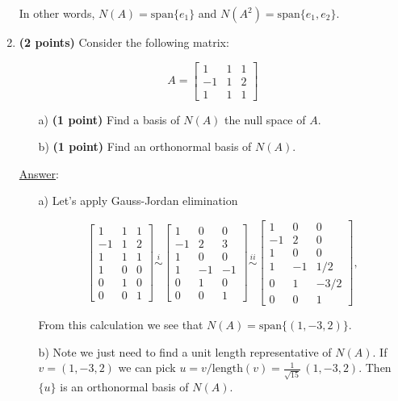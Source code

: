 \documentclass[]{book}
\theoremstyle{definition}
\newcommand{\length}{\textrm{length}}
\newcommand\ans{\underline{Answer}: }
\begin{document}
\begin{enumerate}
In other words, $N(A) = \textrm{span}\{e_1\}$ and $N(A^2) = \textrm{span}\{e_1, e_2\}$. 



\item {\bf (2 points)} Consider the following matrix:

\[
A = \begin{bmatrix}
1 & 1 & 1 \\
-1 & 1 & 2 \\
1 & 1 & 1
\end{bmatrix}
\]
\begin{itemize}
\item[a)] {\bf (1 point)} Find a basis of $N(A)$ the null space of $A$.
\item[b)] {\bf (1 point)} Find an orthonormal basis of $N(A)$.
\end{itemize}

\ans

\begin{itemize}
\item[a)] Let's apply Gauss-Jordan elimination

\[
{\begin{bmatrix}
  1 & 1  & 1 \\
  -1 & 1  & 2 \\ 
  1 & 1  & 1 \\ 
  1 & 0 & 0 \\
  0 & 1 & 0 \\
  0 & 0 & 1
  \end{bmatrix}
}
\stackrel{i}{\sim}
{\begin{bmatrix}
  1 & 0  & 0 \\
  -1 & 2 & 3 \\ 
  1 & 0 & 0 \\ 
  1 & -1 & -1 \\
  0 & 1 & 0 \\
  0 & 0 & 1
  \end{bmatrix}
}
\stackrel{ii}{\sim}
{\begin{bmatrix}
  1 & 0  & 0 \\
  -1 & 2 & 0 \\ 
  1 & 0 & 0 \\ 
  1 & -1 & 1/2 \\
  0 & 1 & -3/2 \\
  0 & 0 & 1
  \end{bmatrix}
},
\]

From this calculation we see that $N(A) = \textrm{span}\{(1,-3, 2)\}$.

\item[b)] Note we just need to find a unit length representative of $N(A)$. If $v=(1,-3,2)$ we can pick $u = v/\length(v) = \frac{1}{\sqrt{15}} \, (1, -3, 2)$. Then $\{u\}$ is an orthonormal basis of $N(A)$.


\end{itemize}
\end{enumerate}
\end{document}
